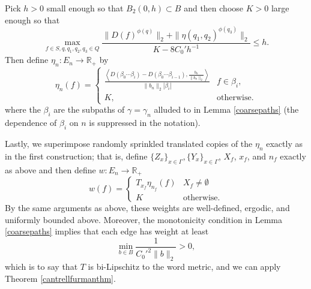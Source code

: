 \documentclass[12pt,reqno]{article}
\numberwithin{equation}{section}
\newcommand{\R}{\mathbb{R}}
\newcommand{\pair}[2]{\left\langle #1, #2 \right\rangle}
\begin{document}
Pick $h > 0$ small enough so that $B_2(0,h) \subset B$ and then choose $K > 0$ large enough so that 
\[ 
   \max_{f \in S, q, q_1, q_2, q_3 \in Q} \frac{ \| D(f)^{\phi(q)} \|_2 + \| \eta(q_1,q_2)^{\phi(q_3)} \|_2 }{ K - 8 C_0' h^{-1} } \le h.
\]
Then define $\eta_n : E_n \to \R_+$ by
\begin{equation*}
  \eta_n(f) = \begin{cases}
                        \frac{\pair{D( \beta_0 \cdots \beta_i) - D( \beta_0 \cdots \beta_{i-1}) }{ \frac{b_n}{\|b_n\|_2}}}
                        {\|b_n\|_2 |\beta_i|}                   & f \in \beta_i,\\
                        K,                                              & \text{otherwise}.
                     \end{cases}
\end{equation*}
where the $\beta_i$ are the subpaths of $\gamma=\gamma_n$ alluded to in Lemma \ref{coarsepaths} (the dependence of $\beta_i$ 
on $n$ is suppressed in the notation).

Lastly, we superimpose randomly sprinkled translated copies of the $\eta_n$ exactly as in the first construction; that is, define 
$\{Z_x\}_{x \in \Gamma}, \{Y_x\}_{x \in \Gamma}$, $X_f$, $x_f$, and $n_f$ exactly as above and then define $w: E_n \to \R_+$
\begin{equation*}
  w(f) = \begin{cases}
              T_{x_f} \eta_{n_f} (f) & X_f \ne \emptyset \\
              K                               & \text{otherwise}.
            \end{cases}
\end{equation*}
By the same arguments as above, these weights are well-defined, ergodic, and uniformly bounded above.
Moreover, the monotonicity condition in Lemma \ref{coarsepaths} implies that each edge has weight at least
\[
   \min_{b \in B} \frac{1}{C_0'^2 \| b \|_2} > 0,
\]
which is to say that $T$ is bi-Lipschitz to the word metric, and we can apply Theorem \ref{cantrellfurmanthm}.
\end{document}
